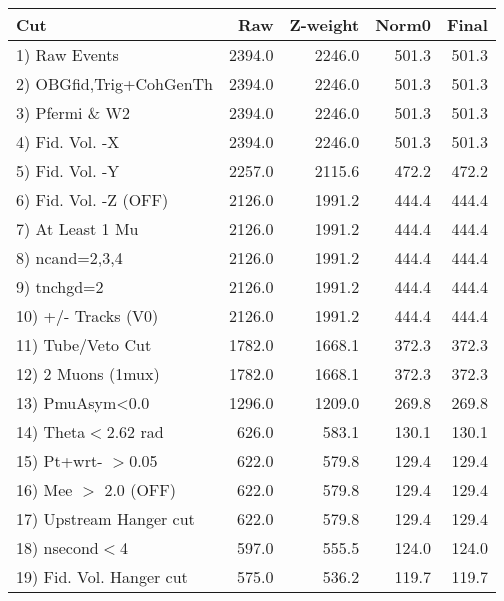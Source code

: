  \begin{table}[h!]\centering
 \begin{tabular}{||l||r|r|r|r||}
 \hline
 \hline
 Cut & Raw & Z-weight & Norm0 & Final \\
 \hline
  1) Raw Events           &      2394.0 &      2246.0 &       501.3 &       501.3 \\
  2) OBGfid,Trig+CohGenTh &      2394.0 &      2246.0 &       501.3 &       501.3 \\
  3) Pfermi \& W2         &      2394.0 &      2246.0 &       501.3 &       501.3 \\
  4) Fid. Vol. -X         &      2394.0 &      2246.0 &       501.3 &       501.3 \\
  5) Fid. Vol. -Y         &      2257.0 &      2115.6 &       472.2 &       472.2 \\
  6) Fid. Vol. -Z (OFF)   &      2126.0 &      1991.2 &       444.4 &       444.4 \\
  7) At Least 1 Mu        &      2126.0 &      1991.2 &       444.4 &       444.4 \\
  8) ncand=2,3,4          &      2126.0 &      1991.2 &       444.4 &       444.4 \\
  9) tnchgd=2             &      2126.0 &      1991.2 &       444.4 &       444.4 \\
 10) +/- Tracks (V0)      &      2126.0 &      1991.2 &       444.4 &       444.4 \\
 11) Tube/Veto Cut        &      1782.0 &      1668.1 &       372.3 &       372.3 \\
 12) 2 Muons (1mux)       &      1782.0 &      1668.1 &       372.3 &       372.3 \\
 13) PmuAsym<0.0          &      1296.0 &      1209.0 &       269.8 &       269.8 \\
 14) Theta$<$2.62 rad     &       626.0 &       583.1 &       130.1 &       130.1 \\
 15) Pt+wrt- $>$0.05      &       622.0 &       579.8 &       129.4 &       129.4 \\
 16) Mee $>$ 2.0  (OFF)   &       622.0 &       579.8 &       129.4 &       129.4 \\
 17) Upstream Hanger cut  &       622.0 &       579.8 &       129.4 &       129.4 \\
 18) nsecond$<$4          &       597.0 &       555.5 &       124.0 &       124.0 \\
 19) Fid. Vol. Hanger cut &       575.0 &       536.2 &       119.7 &       119.7 \\

\end{tabular}
\end{table}
